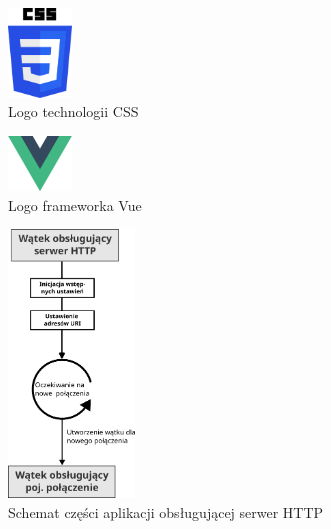 \documentclass[12pt,oneside,a4paper]{book}
\theoremstyle{break}
\begin{document}
\begin{figure}[H]
    \begin{center}
        \includegraphics[width=0.15\textwidth]{logo_css.png}        
        \caption{Logo technologii CSS}        
        \label{rys:logo-css}
    \end{center}
\end{figure}

\begin{figure}[H]
    \begin{center}
        \includegraphics[width=0.15\textwidth]{logo_vue.png}        
        \caption{Logo frameworka Vue}        
        \label{rys:logo-vue}
    \end{center}
\end{figure}

\begin{figure}[H]
    \begin{center}
        \includegraphics[width=0.3\textwidth]{schemat_serwisu_http.png}        
        \caption{Schemat części aplikacji obsługującej serwer HTTP}        
        \label{rys:server-http-flow}
    \end{center}
\end{figure}
\end{document}
